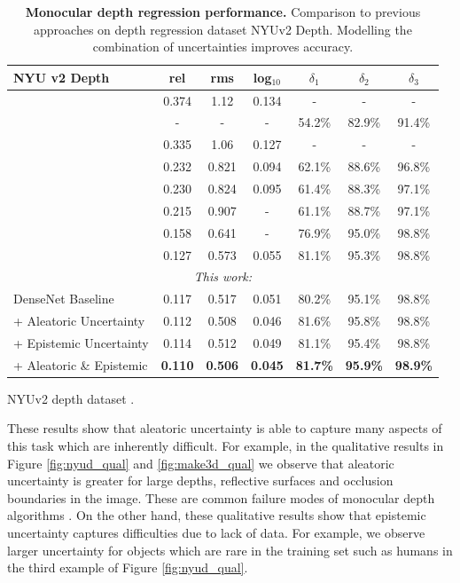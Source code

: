 \begin{table}[p]
\begin{subtable}[b]{\textwidth}
\centering
\begin{tabular}{l|c|c|c|c|c|c}
    \toprule
\textbf{NYU v2 Depth}  & rel & rms & log$_{10}$ & $\delta_1$ & $\delta_2$ & $\delta_3$ \rule{0pt}{2.6ex} \\ 
    \midrule
\citet{karsch2012depth} & 0.374 & 1.12 & 0.134 & - & - & - \\
\citet{ladicky2014pulling} & - & - & - & 54.2\% & 82.9\% & 91.4\% \\
\citet{liu2014discrete} & 0.335 & 1.06 & 0.127 & - & - & - \\
\citet{li2015depth} & 0.232 & 0.821 & 0.094 & 62.1\% & 88.6\% & 96.8\% \\
\citet{liu2015deep} & 0.230 & 0.824 & 0.095 & 61.4\% & 88.3\% & 97.1\% \\
\citet{eigen2014depth} & 0.215 & 0.907 & - & 61.1\% & 88.7\% & 97.1\% \\
\citet{eigen2015predicting} & 0.158 & 0.641 & - & 76.9\% & 95.0\% & 98.8\% \\
\citet{laina2016deeper} & 0.127 & 0.573 & 0.055 & 81.1\% & 95.3\% & 98.8\% \\ 
    \midrule
\multicolumn{7}{c}{\textit{This work:}} \\ 
    \midrule
DenseNet Baseline & 0.117 & 0.517 & 0.051 & 80.2\% & 95.1\% & 98.8\% \\
+ Aleatoric Uncertainty & 0.112 & 0.508 & 0.046 & 81.6\% & 95.8\% & 98.8\% \\
+ Epistemic Uncertainty & 0.114 & 0.512 & 0.049 & 81.1\% & 95.4\% & 98.8\% \\
+ Aleatoric \& Epistemic & \textbf{0.110} & \textbf{0.506} & \textbf{0.045} & \textbf{81.7\%} & \textbf{95.9\%} & \textbf{98.9\%} \\
    \bottomrule
\end{tabular}
\caption{NYUv2 depth dataset \citep{silberman2012indoor}.}
\label{nyuv2depth}
\end{subtable}
\caption[Probabilistic monocular depth regression performance.]{\textbf{Monocular depth regression performance.} Comparison to previous approaches on depth regression dataset NYUv2 Depth. Modelling the combination of uncertainties improves accuracy.}
\end{table}



These results show that aleatoric uncertainty is able to capture many aspects of this task which are inherently difficult. For example, in the qualitative results in Figure \ref{fig:nyud_qual} and \ref{fig:make3d_qual} we observe that aleatoric uncertainty is greater for large depths, reflective surfaces and occlusion boundaries in the image. These are common failure modes of monocular depth algorithms \citep{laina2016deeper}. On the other hand, these qualitative results show that epistemic uncertainty captures difficulties due to lack of data. For example, we observe larger uncertainty for objects which are rare in the training set such as humans in the third example of Figure \ref{fig:nyud_qual}.




